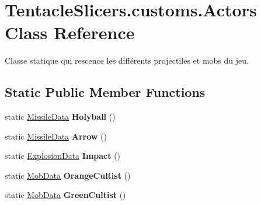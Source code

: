 \hypertarget{class_tentacle_slicers_1_1customs_1_1_actors}{}\section{Tentacle\+Slicers.\+customs.\+Actors Class Reference}
\label{class_tentacle_slicers_1_1customs_1_1_actors}


Classe statique qui rescence les différents projectiles et mobs du jeu.  


\subsection*{Static Public Member Functions}
\begin{DoxyCompactItemize}
\item 
\mbox{\label{class_tentacle_slicers_1_1customs_1_1_actors_aa084eecad74d2b07987201dfc3182444}} 
static \hyperlink{class_tentacle_slicers_1_1actors_1_1_missile_data}{Missile\+Data} {\bfseries Holyball} ()
\item 
\mbox{\label{class_tentacle_slicers_1_1customs_1_1_actors_ac8e1011ec8f25b5b01826016c13938f6}} 
static \hyperlink{class_tentacle_slicers_1_1actors_1_1_missile_data}{Missile\+Data} {\bfseries Arrow} ()
\item 
\mbox{\label{class_tentacle_slicers_1_1customs_1_1_actors_a946bd44d008d1c6fbc29830739759a8b}} 
static \hyperlink{class_tentacle_slicers_1_1actors_1_1_explosion_data}{Explosion\+Data} {\bfseries Impact} ()
\item 
\mbox{\label{class_tentacle_slicers_1_1customs_1_1_actors_addd95fb7db108a3bbf821f6090de78fd}} 
static \hyperlink{class_tentacle_slicers_1_1actors_1_1_mob_data}{Mob\+Data} {\bfseries Orange\+Cultist} ()
\item 
\mbox{\label{class_tentacle_slicers_1_1customs_1_1_actors_a0861a78fb011e1c187dd91d65c1f65fe}} 
static \hyperlink{class_tentacle_slicers_1_1actors_1_1_mob_data}{Mob\+Data} {\bfseries Green\+Cultist} ()
\item 

\end{DoxyCompactItemize}

